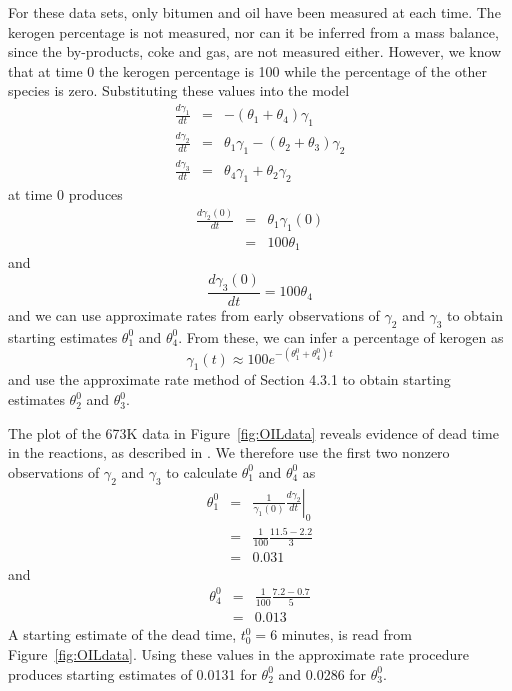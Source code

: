 For these data sets, only
bitumen and oil have been measured at each time.
The kerogen percentage is not measured,
nor can it be inferred from a mass balance, since the
by-products, coke and gas, are not measured either.
However, we know that at time 0 the kerogen percentage is 100
while the percentage of the other species is zero.
Substituting these values into the model
\begin{eqnarray*}
  \frac{d\gamma_1}{d t}&=&- ( \theta_1 + \theta_4 ) \gamma_1\\
  \frac{d\gamma_2}{d t}&=&\theta_1 \gamma_1 -
  ( \theta_2 + \theta_3 ) \gamma_2\\
  \frac{d\gamma_3}{d t}&=&\theta_4 \gamma_1 + \theta_2 \gamma_2
\end{eqnarray*}
at time 0 produces
\begin{eqnarray*}
  \frac{d\gamma_2(0)}{d t}&=&\theta_1\gamma_1 ( 0 )\\
  &=& 100  \theta_1
\end{eqnarray*}
and
\begin{displaymath}
  \frac{d\gamma_3(0)}{d t}=100\theta_4
\end{displaymath}
and we can use approximate rates from early observations of
$\gamma_{2}$ and $\gamma_{3}$ to obtain starting estimates
$\theta_1^{0}$ and $\theta_4^{0}$.
From these, we can infer a percentage of kerogen as
\begin{displaymath}
\gamma_1 ( t )  \approx 
100  e^{ - ( \theta_1^0 + \theta_4^0 ) t }
\end{displaymath}
and use the approximate rate method of Section 4.3.1 to obtain
starting estimates $\theta_2^{0}$ and $\theta_3^{0}$.

The plot of the 673K data in Figure~\ref{fig:OILdata}
reveals evidence of dead time in the reactions, as described in
.
We therefore use the first two nonzero observations of $\gamma_{2}$
and $\gamma_{3}$ to calculate $\theta_1^{0}$ and
$\theta_4^{0}$ as
\begin{eqnarray*}
  \theta_1^0&=&\left.\frac{1}{\gamma_1(0)} 
  \frac{d\gamma_2}{d t}\right|_0\\
  &=&\frac{1}{100}\frac{11.5 - 2.2}{3}\\
  &=& 0.031
\end{eqnarray*}
and
\begin{eqnarray*}
  \theta_4^0&=&\frac{1}{100}\frac{7.2 - 0.7}{5}\\
  &=&  0.013  
\end{eqnarray*}
A starting estimate of the dead time, $t_0^0 = 6$ minutes, is
read from Figure~\ref{fig:OILdata}.
Using these values in the approximate rate procedure produces
starting estimates of 0.0131 for $\theta_2^{0}$ and 0.0286
for $\theta_3^{0}$.

